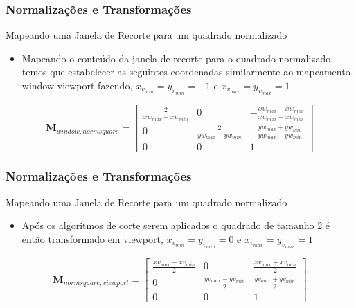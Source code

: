 \documentclass{beamer}
\begin{document}
\begin{frame}
\frametitle{Normalizações e Transformações }

	\begin{block}{Mapeando uma Janela de Recorte para um quadrado normalizado}
		\begin{itemize}
			\item Mapeando o conteúdo da janela de recorte para o quadrado normalizado, temos que estabelecer as seguintes coordenadas similarmente ao mapeamento window-viewport fazendo, $x_{v_{min}} = y_{v_{min}} = -1$ e $x_{v_{max}} = y_{v_{max}} = 1$\\
			\end{itemize}	
	\end{block}
	
	\begin{equation*}
				\textbf{M}_{window,normsquare} = \begin{bmatrix}
					\frac{2}{xw_{max}-xw_{min}}	&	0							&	- \frac{xw_{max}+xw_{min}}{xw_{max}-xw_{min}} \\
					0							&	\frac{2}{yw_{max}-yw_{min}}	&	- \frac{yw_{max}+yw_{min}}{yw_{max}-yw_{min}} \\
					0							&	0							&	1
				\end{bmatrix}
			\end{equation*}	
\end{frame}

\begin{frame}
\frametitle{Normalizações e Transformações }

	\begin{block}{Mapeando uma Janela de Recorte para um quadrado normalizado}
		\begin{itemize}
			\item Após os algoritmos de corte serem aplicados o quadrado de tamanho 2 é então transformado em viewport, $x_{v_{min}} = y_{v_{min}} = 0$ e $x_{v_{max}} = y_{v_{max}} = 1$\\
			\end{itemize}	
	\end{block}
	
	\begin{equation*}
				\textbf{M}_{normsquare,viewport} = \begin{bmatrix}
					\frac{xv_{max}-xv_{min}}{2}	&	0							&	\frac{xv_{max}+xv_{min}}{2} \\
					0							&	\frac{yv_{max}-yv_{min}}{2}	&	\frac{yv_{max}+yv_{min}}{2} \\
					0							&	0							&	1
				\end{bmatrix}
			\end{equation*}	
\end{frame}
\end{document}
